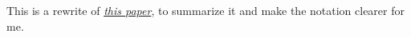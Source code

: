 \documentclass{article}
\begin{document}

This is a rewrite of \href{https://doi.org/10.1109%2FTASL.2006.889720}{\textit{this paper}}, to summarize it and make the notation clearer for me.

%

\end{document}
